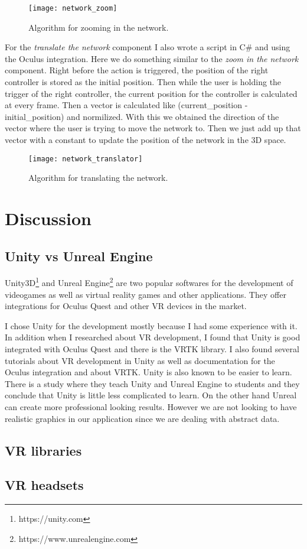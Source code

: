 \begin{figure}[h!]
    \centering%
    \texttt{[image: network\_zoom]}
    \caption{Algorithm for zooming in the network.}
    \label{fig:network_zoom}
\end{figure}%

For the \textit{translate the network} component I also wrote a script in C\# and using the Oculus integration. Here we do something similar to the \textit{zoom in the network} component. Right before the action is triggered, the position of the right controller is stored as the initial position. Then while the user is holding the trigger of the right controller, the current position for the controller is calculated at every frame. Then a vector is calculated like (current\_position - initial\_position) and normilized. With this we obtained the direction of the vector where the user is trying to move the network to. Then we just add up that vector with a constant to update the position of the network in the 3D space.

\begin{figure}[h!]
    \centering%
    \texttt{[image: network\_translator]}
    \caption{Algorithm for translating the network.}
    \label{fig:network_translator}
\end{figure}%

\section{Discussion}

\subsection{Unity vs Unreal Engine}
Unity3D\footnote{https://unity.com} and Unreal Engine\footnote{https://www.unrealengine.com} are two popular softwares for the development of videogames as well as virtual reality games and other applications. They offer integrations for Oculus Quest and other VR devices in the market.

I chose Unity for the development mostly because I had some experience with it. In addition when I researched about VR development, I found that Unity is good integrated with Oculus Quest and there is the VRTK library. I also found several tutorials about VR development in Unity as well as documentation for the Oculus integration and about VRTK. Unity is also known to be easier to learn. There is a study where they teach Unity and Unreal Engine to students and they conclude that Unity is little less complicated to learn\cite{unity_vs_unreal}. On the other hand Unreal can create more professional looking results. However we are not looking to have realistic graphics in our application since we are dealing with abstract data.

\subsection{VR libraries}

\subsection{VR headsets}
